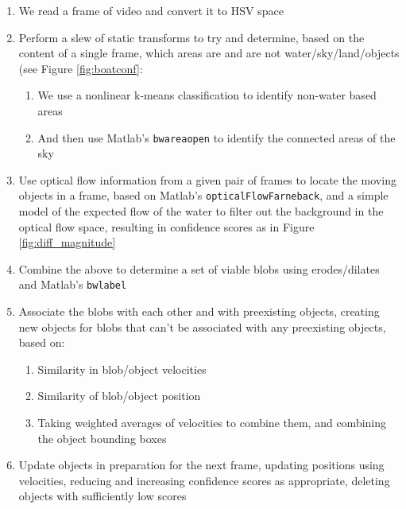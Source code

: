 \documentclass[conference]{IEEEtran}
\begin{document}
\begin{enumerate}
\item We read a frame of video and convert it to HSV space
\item Perform a slew of static transforms to try and determine,
      based on the content of a single frame, which areas are and
      are not water/sky/land/objects (see Figure \ref{fig:boatconf}:
  \begin{enumerate}
    \item We use a nonlinear k-means classification to
          identify non-water based areas
    \item And then use Matlab's \texttt{bwareaopen} to
          identify the connected areas of the sky
  \end{enumerate}
\item Use optical flow information from a given pair of frames to
      locate the moving objects in a frame, based on Matlab's
      \texttt{opticalFlowFarneback}, and a simple model of the
      expected flow of the water to filter out the background in
      the optical flow space, resulting in confidence scores
      as in Figure \ref{fig:diff_magnitude}
\item Combine the above to determine a set of viable blobs using erodes/dilates
      and Matlab's \texttt{bwlabel}
\item Associate the blobs with each other and with preexisting objects,
      creating new objects for blobs that can't be associated with any
      preexisting objects, based on:
  \begin{enumerate}
    \item Similarity in blob/object velocities
    \item Similarity of blob/object position
    \item Taking weighted averages of velocities to combine them, and
          combining the object bounding boxes
  \end{enumerate}
\item Update objects in preparation for the next frame, updating
      positions using velocities, reducing and increasing confidence
      scores as appropriate, deleting objects with sufficiently low
      scores
\end{enumerate}
\end{document}
